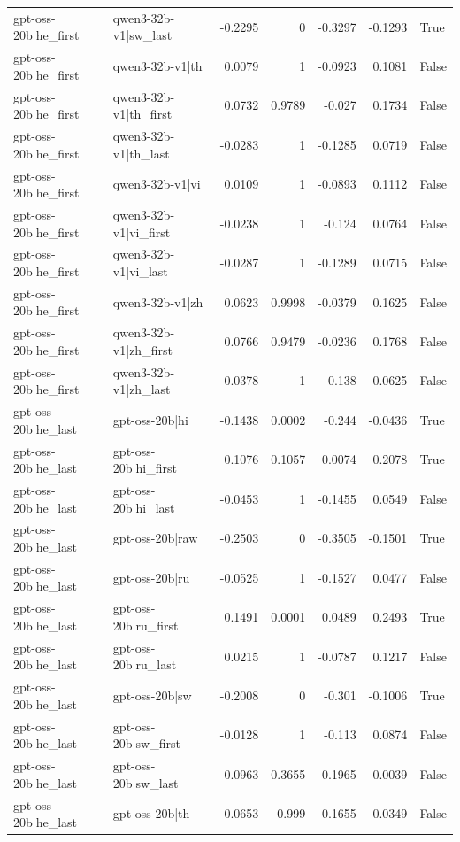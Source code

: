 \begin{table}
\begin{tabular}{l l r r r r l}
gpt-oss-20b|he_first & qwen3-32b-v1|sw_last & -0.2295 & 0 & -0.3297 & -0.1293 & True \\
gpt-oss-20b|he_first & qwen3-32b-v1|th & 0.0079 & 1 & -0.0923 & 0.1081 & False \\
gpt-oss-20b|he_first & qwen3-32b-v1|th_first & 0.0732 & 0.9789 & -0.027 & 0.1734 & False \\
gpt-oss-20b|he_first & qwen3-32b-v1|th_last & -0.0283 & 1 & -0.1285 & 0.0719 & False \\
gpt-oss-20b|he_first & qwen3-32b-v1|vi & 0.0109 & 1 & -0.0893 & 0.1112 & False \\
gpt-oss-20b|he_first & qwen3-32b-v1|vi_first & -0.0238 & 1 & -0.124 & 0.0764 & False \\
gpt-oss-20b|he_first & qwen3-32b-v1|vi_last & -0.0287 & 1 & -0.1289 & 0.0715 & False \\
gpt-oss-20b|he_first & qwen3-32b-v1|zh & 0.0623 & 0.9998 & -0.0379 & 0.1625 & False \\
gpt-oss-20b|he_first & qwen3-32b-v1|zh_first & 0.0766 & 0.9479 & -0.0236 & 0.1768 & False \\
gpt-oss-20b|he_first & qwen3-32b-v1|zh_last & -0.0378 & 1 & -0.138 & 0.0625 & False \\
gpt-oss-20b|he_last & gpt-oss-20b|hi & -0.1438 & 0.0002 & -0.244 & -0.0436 & True \\
gpt-oss-20b|he_last & gpt-oss-20b|hi_first & 0.1076 & 0.1057 & 0.0074 & 0.2078 & True \\
gpt-oss-20b|he_last & gpt-oss-20b|hi_last & -0.0453 & 1 & -0.1455 & 0.0549 & False \\
gpt-oss-20b|he_last & gpt-oss-20b|raw & -0.2503 & 0 & -0.3505 & -0.1501 & True \\
gpt-oss-20b|he_last & gpt-oss-20b|ru & -0.0525 & 1 & -0.1527 & 0.0477 & False \\
gpt-oss-20b|he_last & gpt-oss-20b|ru_first & 0.1491 & 0.0001 & 0.0489 & 0.2493 & True \\
gpt-oss-20b|he_last & gpt-oss-20b|ru_last & 0.0215 & 1 & -0.0787 & 0.1217 & False \\
gpt-oss-20b|he_last & gpt-oss-20b|sw & -0.2008 & 0 & -0.301 & -0.1006 & True \\
gpt-oss-20b|he_last & gpt-oss-20b|sw_first & -0.0128 & 1 & -0.113 & 0.0874 & False \\
gpt-oss-20b|he_last & gpt-oss-20b|sw_last & -0.0963 & 0.3655 & -0.1965 & 0.0039 & False \\
gpt-oss-20b|he_last & gpt-oss-20b|th & -0.0653 & 0.999 & -0.1655 & 0.0349 & False \\

\end{tabular}
\end{table}
